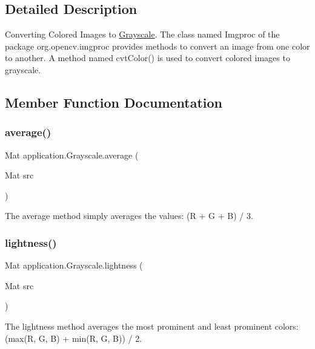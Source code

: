 \subsection{Detailed Description}
Converting Colored Images to \mbox{\hyperlink{classapplication_1_1_grayscale}{Grayscale}}. The class named Imgproc of the package org.\+opencv.\+imgproc provides methods to convert an image from one color to another. A method named cvt\+Color() is used to convert colored images to grayscale. 

\subsection{Member Function Documentation}
\mbox{\label{classapplication_1_1_grayscale_a3ef991beb69461c85a1c6bbf706e0605}} 
\subsubsection{\texorpdfstring{average()}{average()}}
{\footnotesize\ttfamily Mat application.\+Grayscale.\+average (\begin{DoxyParamCaption}\item[{Mat}]{src }\end{DoxyParamCaption})}

The average method simply averages the values\+: (R + G + B) / 3. \mbox{\label{classapplication_1_1_grayscale_a7b371c1462bfa33b5cf1b491cead7ba4}} 
\subsubsection{\texorpdfstring{lightness()}{lightness()}}
{\footnotesize\ttfamily Mat application.\+Grayscale.\+lightness (\begin{DoxyParamCaption}\item[{Mat}]{src }\end{DoxyParamCaption})}

The lightness method averages the most prominent and least prominent colors\+: (max(\+R, G, B) + min(\+R, G, B)) / 2. \mbox{\label{classapplication_1_1_grayscale_a6bf7ea7c89bcc25fa1f2ef43583a3bdb}} 
